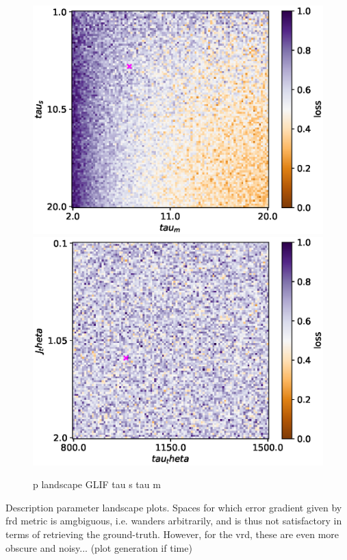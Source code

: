 \documentclass[mphil,deptreport,ianc]{infthesis} %
\begin{document}
\begin{figure}
    \centering
    \vskip -0.1in
    \includegraphics[width=0.9\columnwidth]{figures/param_landscape_heatmaps/microGIF/test_export_2d_heatmap_N_21_loss_tau_m_tau_s.eps}
    \includegraphics[width=0.9\columnwidth]{figures/param_landscape_heatmaps/microGIF/test_export_2d_heatmap_N_21_loss_tau_theta_J_theta.eps}
    \vskip -0.1in
    \caption{p landscape GLIF tau s tau m}
    \vskip -0.2in
\end{figure}

Description parameter landscape plots. Spaces for which error gradient given by frd metric is amgbiguous, i.e. wanders arbitrarily, and is thus not satisfactory in terms of retrieving the ground-truth. 
However, for the vrd, these are even more obscure and noisy... (plot generation if time)
\end{document}
